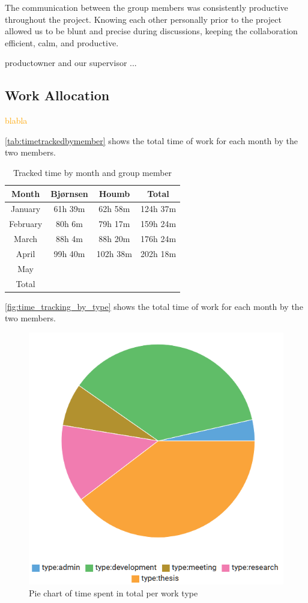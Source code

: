 The communication between the group members was consistently productive throughout the project. Knowing each other personally prior to the project allowed us to be blunt and precise during discussions, keeping the collaboration efficient, calm, and productive.

\gls{productowner} and our supervisor ...

\subsection{Work Allocation}

\textcolor{orange}{blabla}

\autoref{tab:timetrackedbymember} shows the total time of work for each month by the two members.

\begin{table}[h]
    \centering
    \begin{tabular}{c|c|c|c}
        \hline
        \textbf{Month} & \textbf{Bjørnsen} & \textbf{Houmb} & \textbf{Total} \\
        \hline
        January  & 61h 39m  & 62h 58m  & 124h 37m \\
        February & 80h 6m   & 79h 17m  & 159h 24m \\
        March    & 88h 4m   & 88h 20m  & 176h 24m \\
        April    & 99h 40m  & 102h 38m  & 202h 18m \\
        May      &        &        &        \\
        \hline
        Total & & & \\
        \hline
    \end{tabular}
    \caption{Tracked time by month and group member}
    \label{tab:timetrackedbymember}
\end{table}


\autoref{fig:time_tracking_by_type} shows the total time of work for each month by the two members.

\begin{figure}[h]
    \centering
    \includegraphics[width=0.5\linewidth]{figures/traggo_pie_chart_by_type.png}
    \caption{Pie chart of time spent in total per work type}
    \label{fig:time_tracking_by_type}
\end{figure}

